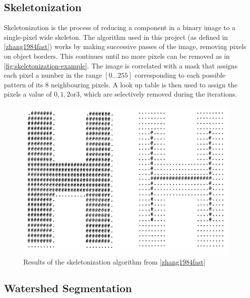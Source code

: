 
\subsection{Skeletonization}
\label{sec:skeletonization}

Skeletonization is the process of reducing a component in a binary image to a single-pixel wide skeleton. The algorithm used in this project (as defined in \cref{zhang1984fast}) works by making successive passes of the image, removing pixels on object borders. This continues until no more pixels can be removed as in \cref{fig:skeletonization-example}.  The image is correlated with a mask that assigns each pixel a number in the range $[0...255]$ corresponding to each possible pattern of its $8$ neighbouring pixels. A look up table is then used to assign the pixels a value of $0, 1, 2 \text{or} 3$, which are selectively removed during the iterations.

\begin{figure}[H]
  \includegraphics{gfx/skeletonization.png}
  \caption{Results of the skeletonization algorithm from \cref{zhang1984fast}}
\end{figure}


\subsection{Watershed Segmentation}

